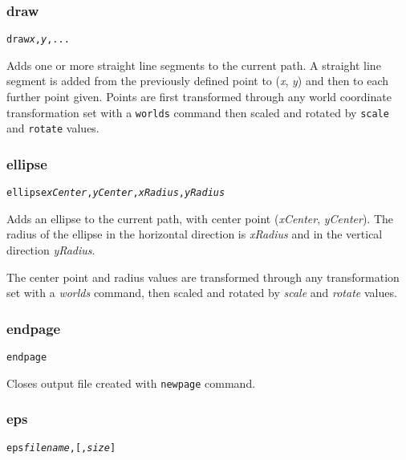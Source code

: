 \subsubsection{draw}

\begin{alltt}
draw \textit{x}, \textit{y}, ...
\end{alltt}

Adds one or more straight line segments to the current path.
A straight line segment is added from the previously defined point
to (\textit{x}, \textit{y}) and then to each further point given.
Points are first transformed through any world coordinate
transformation set with a \texttt{worlds} command
then scaled and rotated by \texttt{scale}
and \texttt{rotate} values.

\subsubsection{ellipse}

\begin{alltt}
ellipse \textit{xCenter}, \textit{yCenter}, \textit{xRadius}, \textit{yRadius}
\end{alltt}

Adds an ellipse to the current path, with center
point (\textit{xCenter}, \textit{yCenter}).  The radius of the ellipse
in the horizontal direction is \textit{xRadius} and in the vertical
direction \textit{yRadius}.

The center point and radius values are transformed through any
transformation set with a \textit{worlds} command,
then scaled and rotated by \textit{scale}
and \textit{rotate} values.

\subsubsection{endpage}

\begin{alltt}
endpage
\end{alltt}

Closes output file created with \texttt{newpage} command.

\subsubsection{eps}

\begin{alltt}
eps \textit{filename}, [, \textit{size}]
\end{alltt}

